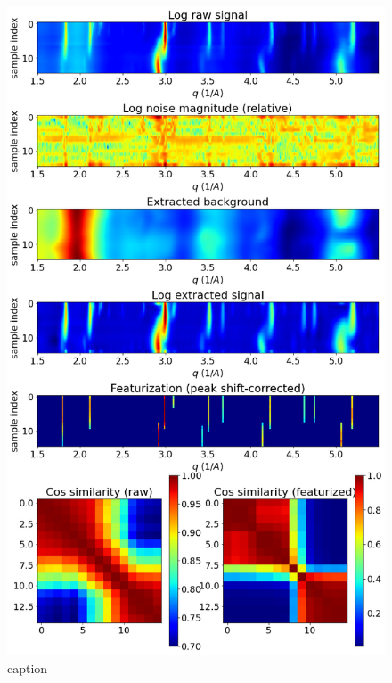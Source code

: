 \documentclass[12pt]{iopart}
\begin{document}
\begin{figure}[h!]
  \centering
    \includegraphics[scale = .55]{paper_figures/pkg/7_composition_summary_peakfit.png}
  \caption{caption}
  \label{fig:7}
\end{figure}
\end{document}
